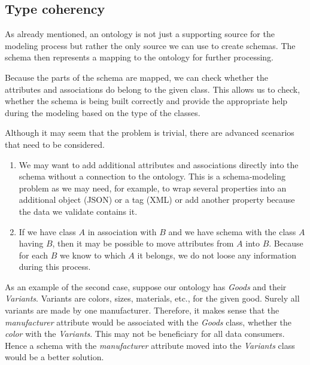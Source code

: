 \subsection*{Type coherency}

As already mentioned, an ontology is not just a supporting source for the modeling process but rather the only source we can use to create schemas. The schema then represents a mapping to the ontology for further processing.

Because the parts of the schema are mapped, we can check whether the attributes and associations do belong to the given class. This allows us to check, whether the schema is being built correctly and provide the appropriate help during the modeling based on the type of the classes.

Although it may seem that the problem is trivial, there are advanced scenarios that need to be considered.

\begin{enumerate}
  \item We may want to add additional attributes and associations directly into the schema without a connection to the ontology. This is a schema-modeling problem as we may need, for example, to wrap several properties into an additional object (JSON) or a tag (XML) or add another property because the data we validate contains it.
  \item If we have class $A$ in association with $B$ and we have schema with the class $A$ having $B$, then it may be possible to move attributes from $A$ into $B$. Because for each $B$ we know to which $A$ it belongs, we do not loose any information during this process.
\end{enumerate}

As an example of the second case, suppose our ontology has \textit{Goods} and their \textit{Variants}. Variants are colors, sizes, materials, etc., for the given good. Surely all variants are made by one manufacturer. Therefore, it makes sense that the \textit{manufacturer} attribute would be associated with the \textit{Goods} class, whether the \textit{color} with the \textit{Variants}. This may not be beneficiary for all data consumers. Hence a schema with the \textit{manufacturer} attribute moved into the \textit{Variants} class would be a better solution.

